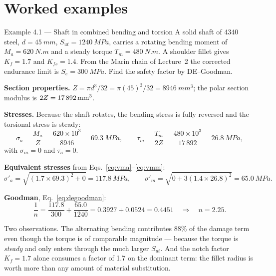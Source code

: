 \documentclass[11pt,a4paper]{article}
\begin{document}
\section{Worked examples}

\begin{examplebox}{Example 4.1 --- Shaft in combined bending and torsion}
A solid shaft of 4340 steel, $d=\SI{45}{mm}$, $S_{ut}=\SI{1240}{MPa}$, carries a rotating bending moment of $M_a=\SI{620}{N.m}$ and a steady torque $T_m=\SI{480}{N.m}$. A shoulder fillet gives $K_f=1.7$ and $K_{fs}=1.4$. From the Marin chain of Lecture~2 the corrected endurance limit is $S_e=\SI{300}{MPa}$. Find the safety factor by DE--Goodman.

\medskip
\textbf{Section properties.} $Z=\pi d^{3}/32=\pi(45)^{3}/32=\SI{8946}{mm^3}$; the polar section modulus is $2Z=\SI{17\,892}{mm^3}$.

\textbf{Stresses.} Because the shaft rotates, the bending stress is fully reversed and the torsional stress is steady:
\[
\sigma_a=\frac{M_a}{Z}=\frac{620\times10^{3}}{8946}=\SI{69.3}{MPa},\qquad
\tau_m=\frac{T_m}{2Z}=\frac{480\times10^{3}}{17\,892}=\SI{26.8}{MPa},
\]
with $\sigma_m=0$ and $\tau_a=0$.

\textbf{Equivalent stresses} from Eqs.~\eqref{eq:vma}--\eqref{eq:vmm}:
\[
\sigma'_a=\sqrt{(1.7\times69.3)^{2}+0}=\SI{117.8}{MPa},\qquad
\sigma'_m=\sqrt{0+3(1.4\times26.8)^{2}}=\SI{65.0}{MPa}.
\]

\textbf{Goodman}, Eq.~\eqref{eq:degoodman}:
\[
\frac{1}{n}=\frac{117.8}{300}+\frac{65.0}{1240}=0.3927+0.0524=0.4451
\quad\Longrightarrow\quad n=\mathbf{2.25}.
\]

\medskip
Two observations. The alternating bending contributes 88\% of the damage term even though the torque is of comparable magnitude --- because the torque is \emph{steady} and only enters through the much larger $S_{ut}$. And the notch factor $K_f=1.7$ alone consumes a factor of 1.7 on the dominant term: the fillet radius is worth more than any amount of material substitution.
\end{examplebox}
\end{document}
